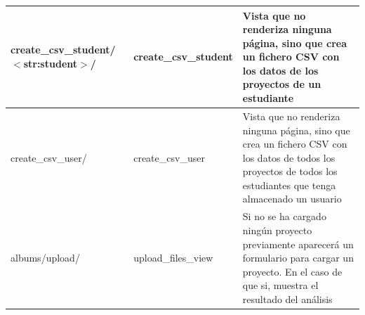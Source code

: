 \documentclass[a4paper, 12pt]{book}
\begin{document}
\begin{table}[H]
\begin{center}
\begin{tabular}{ | m{3.1cm} | m{3.3cm} | m{8.8cm} | }
        create\_csv\_student/ \newline $<$str:student$>$/ &
        create\_csv\_student &
        Vista que no renderiza ninguna página, sino que crea un fichero CSV con los datos de los proyectos de un estudiante \\ \hline
        
        create\_csv\_user/ &
        create\_csv\_user &
        Vista que no renderiza ninguna página, sino que crea un fichero CSV con los datos de todos los proyectos de todos los estudiantes que tenga almacenado un usuario \\ \hline
        
        albums/upload/ &
        upload\_files\_view &
        Si no se ha cargado ningún proyecto previamente aparecerá un formulario para cargar un proyecto. En el caso de que si, muestra el resultado del análisis \\ \hline 
    
      \end{tabular}
     \end{center}
    \end{table}
    
\end{document}
